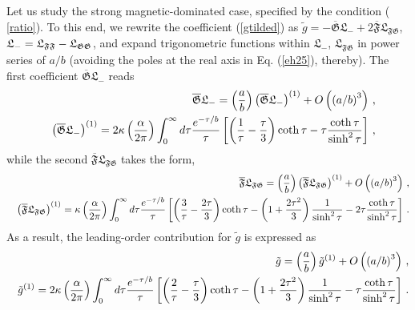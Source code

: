 \documentclass[12pt]{article}
\begin{document}
Let us study the strong magnetic-dominated case, specified by the condition (%
\ref{ratio}). To this end, we rewrite the coefficient (\ref{gtilded}) as $%
\tilde{g}=-\overline{\mathfrak{G}}\mathfrak{L}_{-}+2\overline{\mathfrak{F}}%
\mathfrak{L}_{\mathfrak{FG}}$\thinspace , $\mathfrak{L}_{-}=\mathfrak{L}_{%
\mathfrak{FF}}-\mathfrak{L}_{\mathfrak{GG}}$, and expand trigonometric
functions within $\mathfrak{L}_{-}$, $\mathfrak{L}_{\mathfrak{FG}}$ in power
series of $a/b$ (avoiding the poles at the real axis in Eq. (\ref{eh25}),
thereby). The first coefficient $\overline{\mathfrak{G}}\mathfrak{L}_{-}$
reads%
\begin{eqnarray}
&&\overline{\mathfrak{G}}\mathfrak{L}_{-}=\left( \frac{a}{b}\right) \left( 
\overline{\mathfrak{G}}\mathfrak{L}_{-}\right) ^{\left( 1\right) }+O\left(
\left( a/b\right) ^{3}\right) \,,  \notag \\
&&\left( \overline{\mathfrak{G}}\mathfrak{L}_{-}\right) ^{\left( 1\right)
}=2\kappa \left( \frac{\alpha }{2\pi }\right) \int_{0}^{\infty }d\tau \frac{%
e^{-\tau /b}}{\tau }\left[ \left( \frac{1}{\tau }-\frac{\tau }{3}\right)
\coth \tau -\tau \frac{\coth \tau }{\sinh ^{2}\tau }\right] \,,  \label{ehm3}
\end{eqnarray}%
while the second $\overline{\mathfrak{F}}\mathfrak{L}_{\mathfrak{FG}}$ takes
the form,%
\begin{eqnarray}
&&\overline{\mathfrak{F}}\mathfrak{L}_{\mathfrak{FG}}=\left( \frac{a}{b}%
\right) \left( \overline{\mathfrak{F}}\mathfrak{L}_{\mathfrak{FG}}\right)
^{\left( 1\right) }+O\left( \left( a/b\right) ^{3}\right) \,,  \notag \\
&&\left( \overline{\mathfrak{F}}\mathfrak{L}_{\mathfrak{FG}}\right) ^{\left(
1\right) }=\kappa \left( \frac{\alpha }{2\pi }\right) \int_{0}^{\infty
}d\tau \frac{e^{-\tau /b}}{\tau }\left[ \left( \frac{3}{\tau }-\frac{2\tau }{%
3}\right) \coth \tau -\left( 1+\frac{2\tau ^{2}}{3}\right) \frac{1}{\sinh
^{2}\tau }-2\tau \frac{\coth \tau }{\sinh ^{2}\tau }\right] \,.  \label{ehm4}
\end{eqnarray}%
As a result, the leading-order contribution for $\tilde{g}$ is expressed as%
\begin{eqnarray}
&&\tilde{g}=\left( \frac{a}{b}\right) \tilde{g}^{\left( 1\right) }+O\left(
\left( a/b\right) ^{3}\right) \,,  \notag \\
&&\tilde{g}^{\left( 1\right) }=2\kappa \left( \frac{\alpha }{2\pi }\right)
\int_{0}^{\infty }d\tau \frac{e^{-\tau /b}}{\tau }\left[ \left( \frac{2}{%
\tau }-\frac{\tau }{3}\right) \coth \tau -\left( 1+\frac{2\tau ^{2}}{3}%
\right) \frac{1}{\sinh ^{2}\tau }-\tau \frac{\coth \tau }{\sinh ^{2}\tau }%
\right] \,.  \label{ehm5}
\end{eqnarray}
\end{document}
